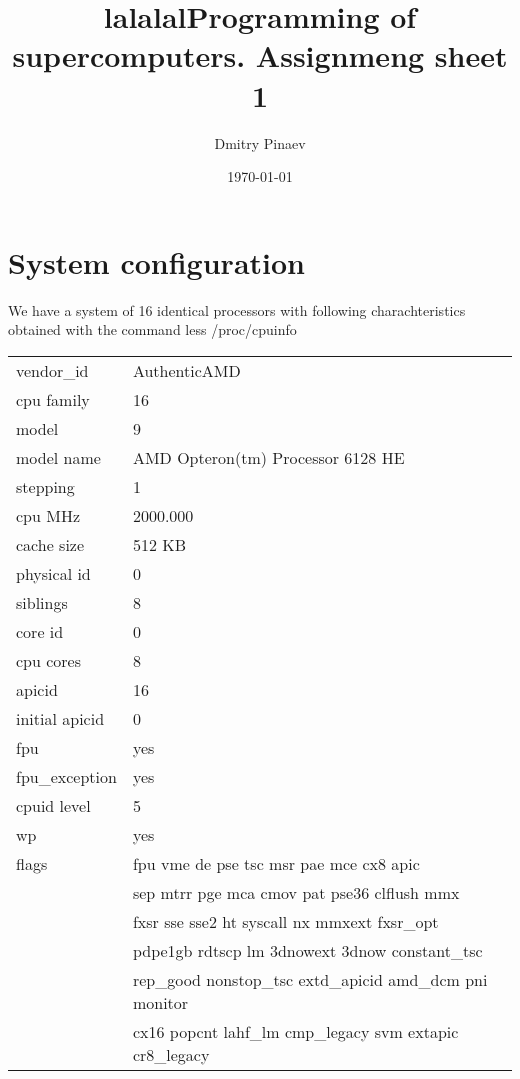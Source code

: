 \documentclass[utf8,12pt]{report}
\title{lalalal}
\begin{document}
\title{Programming of supercomputers. Assignmeng sheet 1}
\author{Dmitry Pinaev}
\date{\today}
\maketitle



\section{System configuration}

We have a system of 16 identical processors with following charachteristics obtained with the command less /proc/cpuinfo

\begin{table}
	\begin{tabular}{|l|l|}
	\hline
		vendor\_id & AuthenticAMD \\ 
		cpu family & 16 \\
		model      & 9 \\
		model name & AMD Opteron(tm) Processor 6128 HE \\
		stepping   & 1 \\
		cpu MHz    & 2000.000 \\
		cache size & 512 KB \\
		physical id& 0 \\
		siblings   & 8 \\
		core id    & 0 \\
		cpu cores  & 8 \\
		apicid     & 16 \\
		initial apicid  & 0 \\
		fpu             & yes \\
		fpu\_exception  & yes \\
		cpuid level     & 5 \\
		wp              & yes \\
		flags           & fpu vme de pse tsc msr pae mce cx8 apic \\
		                & sep mtrr pge mca cmov pat pse36 clflush mmx \\
		                & fxsr sse sse2 ht syscall nx mmxext fxsr\_opt \\
		                & pdpe1gb rdtscp lm 3dnowext 3dnow constant\_tsc \\
		                & rep\_good nonstop\_tsc extd\_apicid amd\_dcm pni monitor \\
		                & cx16 popcnt lahf\_lm cmp\_legacy svm extapic cr8\_legacy \\

\end{tabular}
\end{table}
\end{document}
